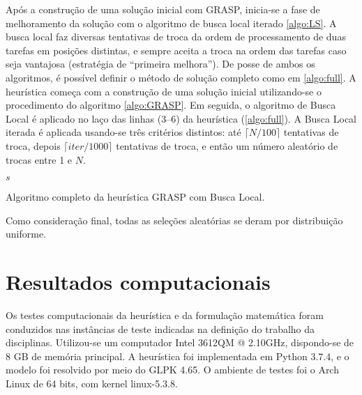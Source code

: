 \documentclass[12pt]{article}
\begin{document}
Após a construção de uma solução inicial com GRASP, inicia-se a fase de
melhoramento da solução com o algoritmo de busca local iterado \ref{algo:LS}.
A busca local faz diversas tentativas de troca da ordem de processamento de
duas tarefas em posições distintas, e sempre aceita a troca na ordem das
tarefas caso seja vantajosa (estratégia de ``primeira melhora''). De posse de
ambos os algoritmos, é possível definir o método de solução completo como em
\ref{algo:full}. A heurística começa com a construção de uma solução inicial
utilizando-se o procedimento do algoritmo \ref{algo:GRASP}. Em seguida, o
algoritmo de Busca Local é aplicado no laço das linhas (3--6) da
heurística (\ref{algo:full}). A Busca Local iterada é aplicada usando-se três
critérios distintos: até $\lceil N/100 \rceil$ tentativas de troca, depois
$\lceil \mathit{iter}/1000 \rceil$ tentativas de troca, e então um número
aleatório de trocas entre 1 e $N$.

\begin{algorithm}[H]
   \footnotesize
   \Return $s$
   \caption{Algoritmo completo da heurística GRASP com Busca Local.}
   \label{algo:full}
\end{algorithm}

Como consideração final, todas as seleções aleatórias se deram
por distribuição uniforme. 

\section{Resultados computacionais}

Os testes computacionais da heurística e da formulação matemática foram
conduzidos nas instâncias de teste indicadas na definição do trabalho da
disciplinas. Utilizou-se um computador Intel 3612QM @ 2.10GHz, dispondo-se de
8 GB de memória principal. A heurística foi implementada em Python 
3.7.4, e o modelo foi resolvido por meio do GLPK 4.65. O ambiente de testes foi
o Arch Linux de 64 bits, com kernel linux-5.3.8.
\end{document}
